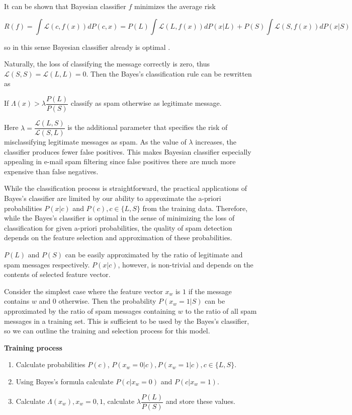 \documentclass[12pt]{report}
\newcommand{\Loss}{\mathcal{L}}
\begin{document}
It can be shown that Bayesian classifier $f$ minimizes the average risk

$$R(f) = \int \Loss(c, f(x)) dP(c, x) = P(L) \int \Loss(L, f(x))dP(x | L) + P(S) \int \Loss(S, f(x))dP(x | S)$$

so in this sense Bayesian classifier already is optimal \cite{Tretyakov}.

Naturally, the loss of classifying the message correctly is zero, thus $\Loss(S, S) = \Loss(L, L) = 0$. Then the Bayes's classification rule can be rewritten as

\begin{center}
	If $\Lambda(x) > \lambda \dfrac{P(L)}{P(S)}$ classify as spam otherwise as legitimate message.
\end{center}

Here $\lambda = \dfrac{\Loss(L, S)}{\Loss(S, L)}$ is the additional parameter that specifies the risk of misclassifying legitimate messages as spam. As the value of $\lambda$ increases, the classifier produces fewer false positives. This makes Bayesian classifier especially appealing in e-mail spam filtering since false positives there are much more expensive than false negatives.

While the classification process is straightforward, the practical applications of Bayes's classifier are limited by our ability to approximate the a-priori probabilities $P(x | c)$ and $P(c), c \in \{L, S\}$ from the training data. Therefore, while the Bayes's classifier is optimal in the sense of minimizing the loss of classification for given a-priori probabilities, the quality of spam detection depends on the feature selection and approximation of these probabilities.

$P(L)$ and $P(S)$ can be easily approximated by the ratio of legitimate and spam messages respectively. $P(x | c)$, however, is non-trivial and depends on the contents of selected feature vector.

Consider the simplest case where the feature vector $x_w$ is $1$ if the message contains $w$ and $0$ otherwise. Then the probability $P(x_w = 1 | S)$ can be approximated by the ratio of spam messages containing $w$ to the ratio of all spam messages in a training set. This is sufficient to be used by the Bayes's classifier, so we can outline the training and selection process for this model.

\textbf{Training process}

\begin{enumerate}
	\item Calculate probabilities $P(c)$, $P(x_w = 0 | c), P(x_w = 1 | c), c \in \{L, S\}$.
	\item Using Bayes's formula calculate $P(c | x_w = 0)$ and $P(c | x_w = 1)$.
	\item Calculate $\Lambda(x_w), x_w = 0, 1$, calculate $\lambda \dfrac{P(L)}{P(S)}$ and store these values.
\end{enumerate}
\end{document}
